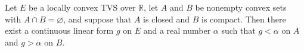 Let $E$ be a locally convex TVS over $\mathbb{R}$, let $A$ and $B$ be nonempty convex sets with $A \cap B = \varnothing$, and suppose that $A$ is closed and $B$ is compact. Then there exist a continuous linear form $g$ on $E$ and a real number $\alpha$ such that $g < \alpha$ on $A$ and $g > \alpha$ on $B$.